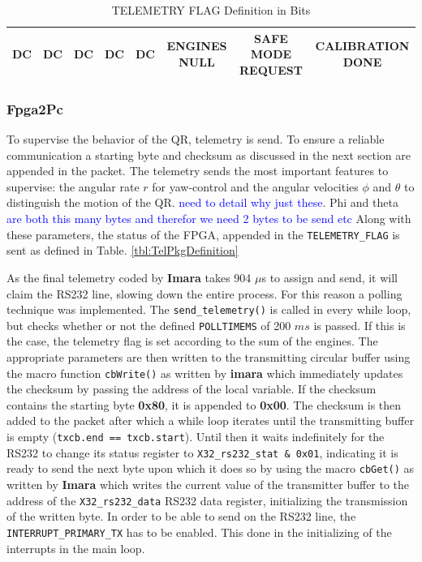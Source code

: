 \documentclass{article}
\newcommand\todo[1]{\textcolor{blue}{#1}} %
\begin{document}
\begin{table}[h]
\centering
\begin{tabular}{|c|c|c|c|c|c|c|c|}
\hline 
DC & DC & DC & DC & DC & ENGINES NULL & SAFE MODE REQUEST & CALIBRATION DONE \\
\hline 
\end{tabular} 
\caption{TELEMETRY FLAG Definition in Bits}
\label{tbl:TelFlagDef}
\end{table}


\subsubsection{Fpga2Pc}
To supervise the behavior of the QR, telemetry is send. To ensure a reliable communication a starting byte and checksum as discussed in the next section are appended in the packet. The telemetry sends the most important features to supervise: the angular rate $r$ for yaw-control and the angular velocities $\phi$ and $\theta$ to distinguish the motion of the QR.  \todo{need to detail why just these}. Phi and theta \todo{are both this many bytes and therefor we need 2 bytes to be send etc} Along with these parameters, the status of the FPGA, appended in the \texttt{TELEMETRY\_FLAG} is sent as defined in Table. \ref{tbl:TelPkgDefinition} 

As the final telemetry coded by \textbf{Imara} takes 904 $\mu$s to assign and send, it will claim the RS232 line, slowing down the entire process. For this reason a polling technique was implemented. The \texttt{send\_telemetry()} is called in every while loop, but checks whether or not the defined \texttt{POLLTIMEMS} of 200 $ms$ is passed. If this is the case, the telemetry flag is set according to the sum of the engines. The appropriate parameters are then written to the transmitting circular buffer using the macro function \texttt{cbWrite()} as written by \textbf{imara} which immediately updates the checksum by passing the address of the local variable. If the checksum contains the starting byte \textbf{0x80}, it is appended to \textbf{0x00}. The checksum is then added to the packet after which a while loop iterates until the transmitting buffer is empty (\texttt{txcb.end == txcb.start}). Until then it waits indefinitely for the RS232 to change its status register to \texttt{X32\_rs232\_stat \& 0x01}, indicating it is ready to send the next byte upon which it does so by using the macro \texttt{cbGet()} as written by \textbf{Imara} which writes the current value of the transmitter buffer to the address of the \texttt{X32\_rs232\_data} RS232 data register, initializing the transmission of the written byte. In order to be able to send on the RS232 line, the \texttt{INTERRUPT\_PRIMARY\_TX} has to be enabled. This done in the initializing of the interrupts in the main loop. 
\end{document}
